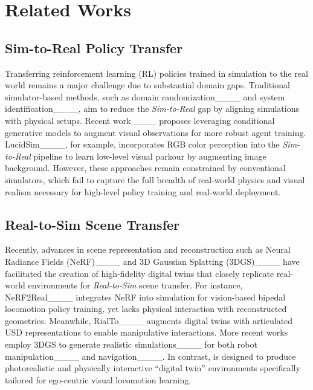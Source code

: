 \section{Related Works}
\label{sec:related_works}
\subsection{Sim-to-Real Policy Transfer} 
Transferring reinforcement learning (RL) policies trained in simulation to the real world remains a major challenge due to substantial domain gaps. Traditional simulator-based methods, such as domain randomization____ and system identification____, aim to reduce the \textit{Sim-to-Real} gap by aligning simulations with physical setups. Recent work____ proposes leveraging conditional generative models to augment visual observations for more robust agent training. LucidSim____, for example, incorporates RGB color perception into the \textit{Sim-to-Real} pipeline to learn low-level visual parkour by augmenting image background. However, these approaches remain constrained by conventional simulators, which fail to capture the full breadth of real-world physics and visual realism necessary for high-level policy training and real-world deployment.

\subsection{Real-to-Sim Scene Transfer} 
Recently, advances in scene representation and reconstruction such as Neural Radiance Fields (NeRF)____ and 3D Gaussian Splatting (3DGS)____ have facilitated the creation of high-fidelity digital twins that closely replicate real-world environments for \textit{Real-to-Sim} scene transfer. For instance, NeRF2Real____ integrates NeRF into simulation for vision-based bipedal locomotion policy training, yet lacks physical interaction with reconstructed geometries. Meanwhile, RialTo____ augments digital twins with articulated USD representations to enable manipulative interactions. More recent works employ 3DGS to generate realistic simulations____ for both robot manipulation____ and navigation____. In contrast, \themodel is designed to produce photorealistic and physically interactive “digital twin” environments specifically tailored for ego-centric visual locomotion learning.